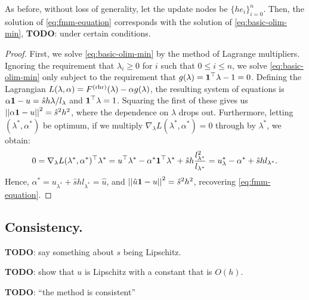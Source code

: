 \documentclass[eikonal.tex]{subfiles}
\begin{document}
\begin{theorem}
  As before, without loss of generality, let the update nodes be
  $\{h e_i\}_{i=0}^n$. Then, the solution of \cref{eq:fmm-equation}
  corresponds with the solution of \cref{eq:basic-olim-min},
  \textbf{TODO}: under certain conditions.
\end{theorem}

\begin{proof}
  First, we solve \cref{eq:basic-olim-min} by the method of Lagrange
  multipliers. Ignoring the requirement that $\lambda_i \geq 0$ for
  $i$ such that $0 \leq i \leq n$, we solve \cref{eq:basic-olim-min}
  only subject to the requirement that
  $g(\lambda) = \boldsymbol{1}^\top \lambda - 1 = 0$. Defining the Lagrangian
  $L(\lambda, \alpha) = F^{\operatorname{(rhr)}}(\lambda) - \alpha g(\lambda)$, the
  resulting system of equations is
  $\alpha \boldsymbol{1} - u = \hat{s} h \lambda / l_\lambda$ and
  $\boldsymbol{1}^\top \lambda = 1$. Squaring the first of these gives us
  $\left|\left|\alpha \boldsymbol{1} - u\right|\right|^2 = \hat{s}^2 h^2$, where the dependence on
  $\lambda$ drops out. Furthermore, letting $(\lambda^*, \alpha^*)$ be
  optimum, if we multiply $\nabla_\lambda L(\lambda^*, \alpha^*) = 0$ through by
  $\lambda^*$, we obtain:
  \begin{equation*}
    0 = \nabla_\lambda L(\lambda^*, \alpha^*)^\top \lambda^* = u^\top \lambda^* - \alpha^* \boldsymbol{1}^\top \lambda^* + \hat{s} h \frac{l_{\lambda^*}^2}{l_{\lambda^*}} = u_\lambda^* - \alpha^* + \hat{s} h l_{\lambda^*}.
  \end{equation*}
  Hence, $\alpha^* = u_{\lambda^*} + \hat{s} h l_{\lambda^*} = \hat{u}$, and
  $\left|\left|\hat{u} \boldsymbol{1} - u\right|\right|^2 = \hat{s}^2 h^2$, recovering
  \cref{eq:fmm-equation}.
\end{proof}

\subsection{Consistency.}

\textbf{TODO}: say something about $s$ being Lipschitz.

\begin{lemma}
  \textbf{TODO}: show that $u$ is Lipschitz with a constant that is
  $O(h)$.
\end{lemma}

\begin{theorem}
  \textbf{TODO}: ``the method is consistent''
\end{theorem}
\end{document}
